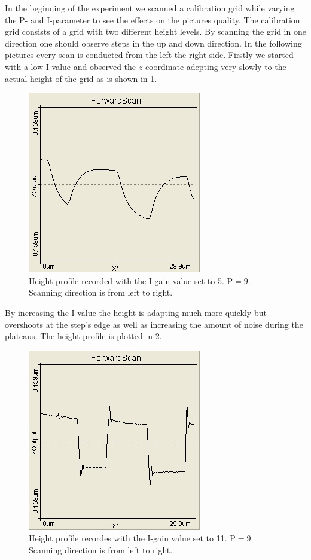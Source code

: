 \documentclass[paper=a4,fontsize=10pt,DIV=18,twocolumn,parskip=half]{scrartcl}
\numberwithin{equation}{section}    %
\begin{document}
In the beginning of the experiment we scanned a calibration grid while varying the P- and I-parameter to see the effects on the pictures quality. The calibration grid consists of a grid with two different height levels. By scanning the grid in one direction one should observe steps in the up and down direction. In the following pictures every scan is conducted from the left the right side. Firstly we started with a low I-value and observed the $z$-coordinate adepting very slowly to the actual height of the grid as is shown in \ref{wenigI}.

\begin{figure}[htp]
	\begin{center}
		\includegraphics[width=0.6\columnwidth]{Bilder/wenigI}
		\caption{Height profile recorded with the I-gain value set to 5. $\mathrm{P}=9$. Scanning direction is from left to right.}
		\label{wenigI}
	\end{center}
\end{figure}

By increasing the I-value the height is adapting much more quickly but overshoots at the step's edge as well as increasing the amount of noise during the plateaus. The height profile is plotted in \ref{vielI}.

\begin{figure}[htp]
	\begin{center}
		\includegraphics[width=0.6\columnwidth]{Bilder/vielI}
		\caption{Height profile recordes with the I-gain value set to 11. $\mathrm{P}=9$. Scanning direction is from left to right.}
		\label{vielI}
	\end{center}
\end{figure}
\end{document}
